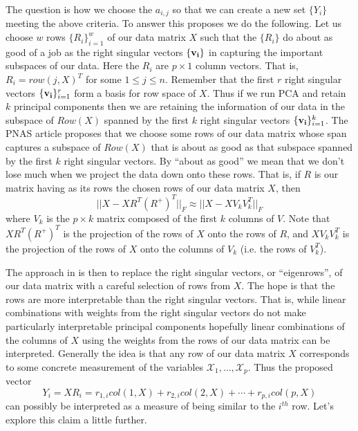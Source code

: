 \documentclass{book}
\begin{document}
The question is how we choose the $a_{i,j}$ so that we can create a new set $\{Y_i\}$ meeting the above criteria. To answer this \cite{pnas} proposes we do the following. Let us choose $w$ rows $\{R_i\}_{i=1}^{w}$ of our data matrix $X$ such that the $\{R_i\}$ do about as good of a job as the right singular vectors $\{{\bf v_i}\}$ in capturing the important subspaces of our data. Here the $R_i$ are $p\times 1$ column vectors. That is, $R_i=row(j,X)^T$ for some $1 \leq j \leq n$. Remember that the first $r$ right singular vectors $\{{\bf v_i}\}_{i=1}^{r}$ form a basis for row space of $X$. Thus if we run PCA and retain $k$ principal components then we are retaining the information of our data in the subspace of $Row(X)$ spanned by the first $k$ right singular vectors $\{{\bf v_i}\}_{i=1}^{k}$. The PNAS article \cite{pnas} proposes that we choose some rows of our data matrix whose span captures a subspace of $Row(X)$ that is about as good as that subspace spanned by the first $k$ right singular vectors. By ``about as good'' we mean that we don't lose much when we project the data down onto these rows. That is, if $R$ is our matrix having as its rows the chosen rows of our data matrix $X$, then
$$
||X-XR^T(R^+)^T||_F \approx ||X-XV_kV_k^T||_F
$$
where $V_k$ is the $p \times k$ matrix composed of the first $k$ columns of $V$. Note that $XR^T(R^+)^T$ is the projection of the rows of $X$ onto the rows of $R$, and $XV_kV_k^T$ is the projection of the rows of $X$ onto the columns of $V_k$ (i.e. the rows of $V_k^T$). 

The approach in \cite{pnas} is then to replace the right singular vectors, or ``eigenrows'', of our data matrix with a careful selection of rows from $X$. The hope is that the rows are more interpretable than the right singular vectors. That is, while linear combinations with weights from the right singular vectors do not make particularly interpretable principal components hopefully linear combinations of the columns of $X$ using the weights from the rows of our data matrix can be interpreted. Generally the idea is that any row of our data matrix $X$ corresponds to some concrete measurement of the variables $\mathscr{X}_1,\ldots,\mathscr{X}_p$. Thus the proposed vector
$$
Y_i=XR_i=r_{1,i}col(1,X)+r_{2,i}col(2,X)+\cdots+r_{p,i}col(p,X)
$$
can possibly be interpreted as a measure of being similar to the $i^{th}$ row. Let's explore this claim a little further.
\end{document}

